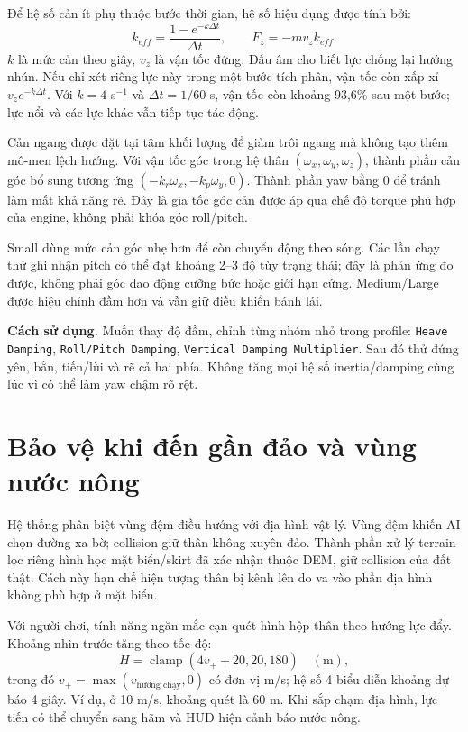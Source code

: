 \documentclass[11pt,a4paper,oneside]{report}
\newcommand{\howto}[1]{\par\smallskip\noindent\textbf{Cách sử dụng.} #1\par}
\begin{document}
Để hệ số cản ít phụ thuộc bước thời gian, hệ số hiệu dụng được tính bởi:
\begin{equation}\label{eq:damping}
 k_{eff}=\frac{1-e^{-k\Delta t}}{\Delta t},\qquad
 F_z=-m v_z k_{eff}.
\end{equation}
$k$ là mức cản theo giây, $v_z$ là vận tốc đứng. Dấu âm cho biết lực chống lại hướng nhún. Nếu chỉ xét riêng lực này trong một bước tích phân, vận tốc còn xấp xỉ $v_z e^{-k\Delta t}$. Với $k=4$ s$^{-1}$ và $\Delta t=1/60$ s, vận tốc còn khoảng 93,6\% sau một bước; lực nổi và các lực khác vẫn tiếp tục tác động.

Cản ngang được đặt tại tâm khối lượng để giảm trôi ngang mà không tạo thêm mô-men lệch hướng. Với vận tốc góc trong hệ thân $(\omega_x,\omega_y,\omega_z)$, thành phần cản góc bổ sung tương ứng $(-k_r\omega_x,-k_p\omega_y,0)$. Thành phần yaw bằng 0 để tránh làm mất khả năng rẽ. Đây là gia tốc góc cản được áp qua chế độ torque phù hợp của engine, không phải khóa góc roll/pitch.

Small dùng mức cản góc nhẹ hơn để còn chuyển động theo sóng. Các lần chạy thử ghi nhận pitch có thể đạt khoảng 2--3 độ tùy trạng thái; đây là phản ứng đo được, không phải góc dao động cưỡng bức hoặc giới hạn cứng. Medium/Large được hiệu chỉnh đầm hơn và vẫn giữ điều khiển bánh lái.
\howto{Muốn thay độ đầm, chỉnh từng nhóm nhỏ trong profile: \texttt{Heave Damping}, \texttt{Roll/Pitch Damping}, \texttt{Vertical Damping Multiplier}. Sau đó thử đứng yên, bắn, tiến/lùi và rẽ cả hai phía. Không tăng mọi hệ số inertia/damping cùng lúc vì có thể làm yaw chậm rõ rệt.}

\section{Bảo vệ khi đến gần đảo và vùng nước nông}
Hệ thống phân biệt vùng đệm điều hướng với địa hình vật lý. Vùng đệm khiến AI chọn đường xa bờ; collision giữ thân không xuyên đảo. Thành phần xử lý terrain lọc riêng hình học mặt biển/skirt đã xác nhận thuộc DEM, giữ collision của đất thật. Cách này hạn chế hiện tượng thân bị kênh lên do va vào phần địa hình không phù hợp ở mặt biển.

Với người chơi, tính năng ngăn mắc cạn quét hình hộp thân theo hướng lực đẩy. Khoảng nhìn trước tăng theo tốc độ:
\begin{equation}
 H=\operatorname{clamp}(4v_++20,20,180)\quad(\text{m}),
\end{equation}
trong đó $v_+=\max(v_{\text{hướng chạy}},0)$ có đơn vị m/s; hệ số 4 biểu diễn khoảng dự báo 4 giây. Ví dụ, ở 10 m/s, khoảng quét là 60 m. Khi sắp chạm địa hình, lực tiến có thể chuyển sang hãm và HUD hiện cảnh báo nước nông.
\end{document}
